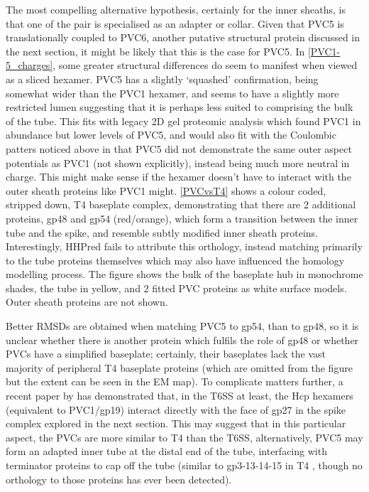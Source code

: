 The most compelling alternative hypothesis, certainly for the inner sheaths, is that one of the pair is specialised as an adapter or collar. Given that PVC5 is translationally coupled to PVC6, another putative structural protein discussed in the next section, it might be likely that this is the case for PVC5. In \vref{PVC1-5_charges}, some greater structural differences do seem to manifest when viewed as a sliced hexamer. PVC5 has a slightly `squashed' confirmation, being somewhat wider than the PVC1 hexamer, and seems to have a slightly more restricted lumen suggesting that it is perhaps less suited to comprising the bulk of the tube. This fits with legacy 2D gel proteomic analysis which found PVC1 in abundance but lower levels of PVC5, and would also fit with the Coulombic patters noticed above in that PVC5 did not demonstrate the same outer aspect potentials as PVC1 (not shown explicitly), instead being much more neutral in charge. This might make sense if the hexamer doesn't have to interact with the outer sheath proteins like PVC1 might. \vref{PVCvsT4} shows a colour coded, stripped down, T4 baseplate complex, demonstrating that there are 2 additional proteins, gp48 and gp54 (red/orange), which form a transition between the inner tube and the spike, and resemble subtly modified inner sheath proteins. Interestingly, HHPred fails to attribute this orthology, instead matching primarily to the tube proteins themselves which may also have influenced the homology modelling process. The figure shows the bulk of the baseplate hub in monochrome shades, the tube in yellow, and 2 fitted PVC proteins as white surface models. Outer sheath proteins are not shown.

Better RMSDs are obtained when matching PVC5 to gp54, than to gp48, so it is unclear whether there is another protein which fulfils the role of gp48 or whether PVCs have a simplified baseplate; certainly, their baseplates lack the vast majority of peripheral T4 baseplate proteins (which are omitted from the figure but the extent can be seen in the EM map). To complicate matters further, a recent paper by \cite{Renault2018} has demonstrated that, in the T6SS at least, the Hcp hexamers (equivalent to PVC1/gp19) interact directly with the face of gp27 in the spike complex explored in the next section. This may suggest that in this particular aspect, the PVCs are more similar to T4 than the T6SS, alternatively, PVC5 may form an adapted inner tube at the distal end of the tube, interfacing with terminator proteins to cap off the tube (similar to gp3-13-14-15 in T4 \citep{Fokine2013}, though no orthology to those proteins has ever been detected).

